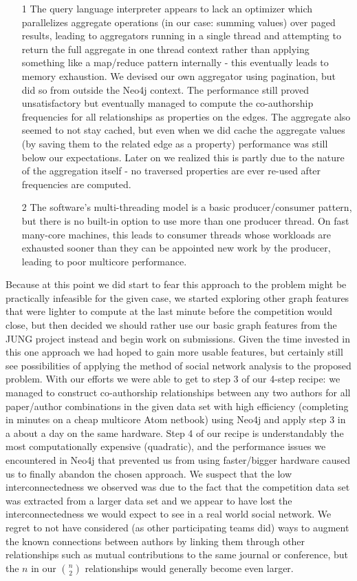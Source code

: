 \begin{enumerate}


\item[1] The query language interpreter appears to lack an optimizer which parallelizes aggregate operations (in our case: summing values) over paged results, leading to aggregators running in a single thread and attempting to return the full aggregate in one thread context rather than applying something like a map/reduce pattern internally - this eventually leads to memory exhaustion.
We devised our own aggregator using pagination, but did so from outside the Neo4j context.
The performance still proved unsatisfactory but eventually managed to compute the co-authorship frequencies for all relationships as properties on the edges.
The aggregate also seemed to not stay cached, but even when we did cache the aggregate values (by saving them to the related edge as a property) performance was still below our expectations.
Later on we realized this is partly due to the nature of the aggregation itself - no traversed properties are ever re-used after frequencies are computed.

\item[2] The software's multi-threading model is a basic producer/consumer pattern, but there is no built-in option to use more than one producer thread.
	On fast many-core machines, this leads to consumer threads whose workloads are exhausted sooner than they can be appointed new work by the producer, leading to poor multicore performance.
\end{enumerate}
Because at this point we did start to fear this approach to the problem might be practically infeasible for the given case, we started exploring other graph features that were lighter to compute at the last minute before the competition would close, but then decided we should rather use our basic graph features from the JUNG project instead and begin work on submissions.
Given the time invested in this one approach we had hoped to gain more usable features, but certainly still see possibilities of applying the method of social network analysis to the proposed problem.
With our efforts we were able to get to step 3 of our 4-step recipe: we managed to construct co-authorship relationships between any two authors for all paper/author combinations in the given data set with high efficiency (completing in minutes on a cheap multicore Atom netbook) using Neo4j and apply step 3 in a about a day on the same hardware.
Step 4 of our recipe is understandably the most computationally expensive (quadratic), and the performance issues we encountered in Neo4j that prevented us from using faster/bigger hardware caused us to finally abandon the chosen approach.
We suspect that the low interconnectedness we observed was due to the fact that the competition data set was extracted from a larger data set and we appear to have lost the interconnectedness we would expect to see in a real world social network.
We regret to not have considered (as other participating teams did) ways to augment the known connections between authors by linking them through other relationships such as mutual contributions to the same journal or conference, but the $n$ in our $n \choose 2$ relationships would generally become even larger.

